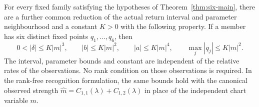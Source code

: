 \begin{proposition}
\label{sat:weighted-confinement}
For every fixed family satisfying the hypotheses of
Theorem~\ref{thm:six-main}, there are a further common reduction of
the actual return interval and parameter neighbourhood and a constant
\(K>0\) with the following property. If a member has six distinct
fixed points \(q_1,\ldots,q_6\), then
\begin{equation}\label{sat:weighted-bounds}
 0<|\delta|\le K|m|^3,\qquad
 |b|\le K|m|^2,\qquad |a|\le K|m|^4,\qquad
 \max_j|q_j|\le K|m|^2.
\end{equation}
The interval, parameter bounds and constant are independent of the
relative rates of the observations. No rank condition on those
observations is required. In the rank-free recognition formulation,
the same bounds hold with the canonical observed strength
\(\widehat m=C_{1,1}(\lambda)+C_{1,2}(\lambda)\) in place of
the independent chart variable \(m\).
\end{proposition}

